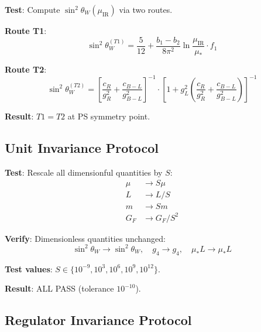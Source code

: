 \documentclass[11pt,a4paper]{article}
\begin{document}
\begin{invariancebox}
\label{box:app-scheme}
\textbf{Test}: Compute $\sin^2\theta_W(\mu_{\text{IR}})$ via two routes.

\textbf{Route T1}:
\begin{equation}
\label{eq:app-T1}
\sin^2\theta_W^{(T1)} = \frac{5}{12} + \frac{b_1 - b_2}{8\pi^2}\ln\frac{\mu_{\text{IR}}}{\mu_*} \cdot f_1
\end{equation}

\textbf{Route T2}:
\begin{equation}
\label{eq:app-T2}
\sin^2\theta_W^{(T2)} = \left[\frac{c_R}{g_R^2} + \frac{c_{B-L}}{g_{B-L}^2}\right]^{-1} \cdot \left[1 + g_L^2\left(\frac{c_R}{g_R^2} + \frac{c_{B-L}}{g_{B-L}^2}\right)\right]^{-1}
\end{equation}

\textbf{Result}: $T1 = T2$ at PS symmetry point.
\end{invariancebox}

\subsection{Unit Invariance Protocol}
\label{app:unit-inv}

\begin{invariancebox}
\label{box:app-unit}
\textbf{Test}: Rescale all dimensionful quantities by $S$:
\begin{align}
\label{eq:app-unit-mu} \mu &\to S\mu \\
\label{eq:app-unit-L} L &\to L/S \\
\label{eq:app-unit-m} m &\to Sm \\
\label{eq:app-unit-GF} G_F &\to G_F/S^2
\end{align}

\textbf{Verify}: Dimensionless quantities unchanged:
\begin{equation}
\label{eq:app-unit-check}
\sin^2\theta_W \to \sin^2\theta_W, \quad g_4 \to g_4, \quad \mu_* L \to \mu_* L
\end{equation}

\textbf{Test values}: $S \in \{10^{-9}, 10^3, 10^6, 10^9, 10^{12}\}$.

\textbf{Result}: ALL PASS (tolerance $10^{-10}$).
\end{invariancebox}

\subsection{Regulator Invariance Protocol}
\label{app:regulator-inv}
\end{document}
